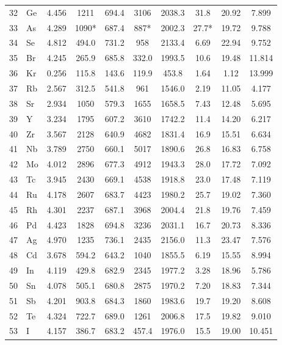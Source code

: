 \documentclass[11pt,a4paper]{article}
\begin{document}
\begin{longtable}{@{}llcccccccc@{}}
		32 & Ge  & 4.456 & 1211   & 694.4  & 3106   & 2038.3 & 31.8  & 20.92 & 7.899 \\
		33 & As  & 4.289 & 1090*  & 687.4  & 887*   & 2002.3 & 27.7* & 19.72 & 9.788 \\
		34 & Se  & 4.812 & 494.0  & 731.2  & 958    & 2133.4 & 6.69  & 22.94 & 9.752 \\
		35 & Br  & 4.245 & 265.9  & 685.8  & 332.0  & 1993.5 & 10.6  & 19.48 & 11.814 \\
		36 & Kr  & 0.256 & 115.8  & 143.6  & 119.9  & 453.8  & 1.64  & 1.12  & 13.999 \\
		37 & Rb  & 2.567 & 312.5  & 541.8  & 961    & 1546.0 & 2.19  & 11.05 & 4.177 \\
		38 & Sr  & 2.934 & 1050   & 579.3  & 1655   & 1658.5 & 7.43  & 12.48 & 5.695 \\
		39 & Y   & 3.234 & 1795   & 607.2  & 3610   & 1742.2 & 11.4  & 14.20 & 6.217 \\
		40 & Zr  & 3.567 & 2128   & 640.9  & 4682   & 1831.4 & 16.9  & 15.51 & 6.634 \\
		41 & Nb  & 3.789 & 2750   & 660.1  & 5017   & 1890.6 & 26.8  & 16.83 & 6.758 \\
		42 & Mo  & 4.012 & 2896   & 677.3  & 4912   & 1943.3 & 28.0  & 17.72 & 7.092 \\
		43 & Tc  & 3.945 & 2430   & 669.1  & 4538   & 1918.8 & 23.0  & 17.48 & 7.119 \\
		44 & Ru  & 4.178 & 2607   & 683.7  & 4423   & 1980.2 & 25.7  & 19.02 & 7.360 \\
		45 & Rh  & 4.301 & 2237   & 687.1  & 3968   & 2004.4 & 21.8  & 19.76 & 7.459 \\
		46 & Pd  & 4.423 & 1828   & 694.8  & 3236   & 2031.1 & 16.7  & 20.73 & 8.336 \\
		47 & Ag  & 4.970 & 1235   & 736.1  & 2435   & 2156.0 & 11.3  & 23.47 & 7.576 \\
		48 & Cd  & 3.678 & 594.2  & 643.2  & 1040   & 1855.5 & 6.19  & 15.55 & 8.994 \\
		49 & In  & 4.119 & 429.8  & 682.9  & 2345   & 1977.2 & 3.28  & 18.96 & 5.786 \\
		50 & Sn  & 4.078 & 505.1  & 680.8  & 2875   & 1970.2 & 7.20  & 18.83 & 7.344 \\
		51 & Sb  & 4.201 & 903.8  & 684.3  & 1860   & 1983.6 & 19.7  & 19.20 & 8.608 \\
		52 & Te  & 4.324 & 722.7  & 689.0  & 1261   & 2006.8 & 17.5  & 19.82 & 9.010 \\
		53 & I   & 4.157 & 386.7  & 683.2  & 457.4  & 1976.0 & 15.5  & 19.00 & 10.451 \\

\end{longtable}
\end{document}
